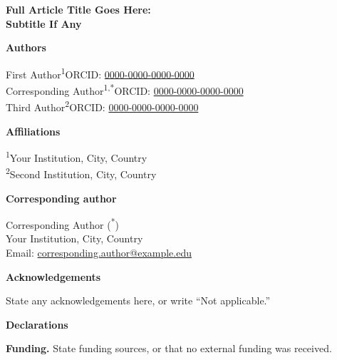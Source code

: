 \documentclass[11pt,a4paper]{article}
\begin{document}
{\LARGE\bfseries Full Article Title Goes Here:\\[2pt]
Subtitle If Any\par}

\vspace{1.5em}

{\large\bfseries Authors\par}
\vspace{0.4em}
First Author\textsuperscript{1}\quad ORCID: \href{https://orcid.org/0000-0000-0000-0000}{0000-0000-0000-0000}\\[4pt]
Corresponding Author\textsuperscript{1,*}\quad ORCID: \href{https://orcid.org/0000-0000-0000-0000}{0000-0000-0000-0000}\\[4pt]
Third Author\textsuperscript{2}\quad ORCID: \href{https://orcid.org/0000-0000-0000-0000}{0000-0000-0000-0000}

\vspace{1.2em}

{\large\bfseries Affiliations\par}
\vspace{0.4em}
\textsuperscript{1}Your Institution, City, Country\\
\textsuperscript{2}Second Institution, City, Country

\vspace{1.2em}

{\large\bfseries Corresponding author\par}
\vspace{0.4em}
Corresponding Author (\textsuperscript{*})\\
Your Institution, City, Country\\
Email: \href{mailto:corresponding.author@example.edu}{corresponding.author@example.edu}

\vspace{1.2em}

{\large\bfseries Acknowledgements\par}
\vspace{0.4em}
State any acknowledgements here, or write ``Not applicable.''

\vspace{1.5em}

{\Large\bfseries Declarations\par}
\vspace{0.6em}

\textbf{Funding.} State funding sources, or that no external funding was received.
\end{document}
